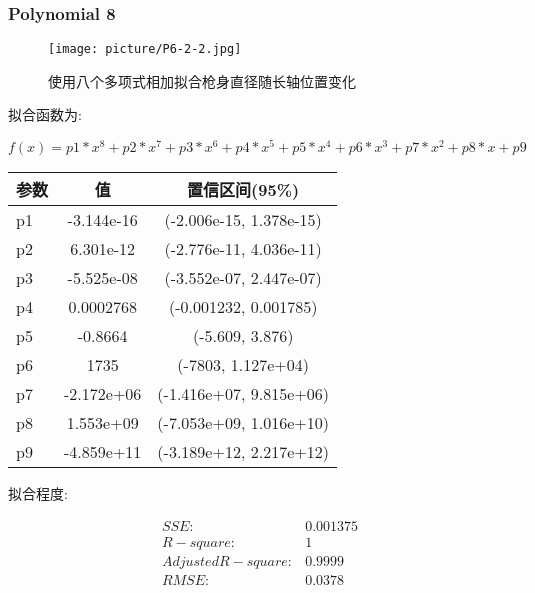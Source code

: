 \documentclass[UTF8]{ctexart}
\begin{document}
				\subsubsection{Polynomial 8}
				\begin{figure}[h]
					\texttt{[image: picture/P6-2-2.jpg]}
					\caption{使用八个多项式相加拟合枪身直径随长轴位置变化}
				\end{figure}
				\begin{flushleft}
					拟合函数为:
				\end{flushleft}
				\begin{center}
					\[    f(x) = p1*x^8 + p2*x^7 + p3*x^6 + p4*x^5 + 
					p5*x^4 + p6*x^3 + p7*x^2 + p8*x + p9
					\]				
					\begin{tabular}{|l|c|c|}
						\hline
						参数&值&置信区间(95\%)\\
						\hline
						 p1 &  -3.144e-16&  (-2.006e-15, 1.378e-15)\\
						 \hline
						p2 &   6.301e-12&  (-2.776e-11, 4.036e-11)\\
						\hline
						p3 &  -5.525e-08&  (-3.552e-07, 2.447e-07)\\
						\hline
						p4 &   0.0002768&  (-0.001232, 0.001785)\\
						\hline
						p5 &     -0.8664&  (-5.609, 3.876)\\
						\hline
						p6 &        1735&  (-7803, 1.127e+04)\\
						\hline
						p7 &  -2.172e+06&  (-1.416e+07, 9.815e+06)\\
						\hline
						p8 &   1.553e+09&  (-7.053e+09, 1.016e+10)\\
						\hline
						p9 &  -4.859e+11&  (-3.189e+12, 2.217e+12)\\
						\hline
										
					\end{tabular}
				\end{center}
				\begin{flushleft}
					拟合程度:
				\end{flushleft}
				\begin{center}
					$$
					\begin{matrix}
					SSE:&0.001375\\
					R-square:&1\\
					Adjusted R-square:&0.9999\\
					RMSE:&0.0378\\
					\end{matrix}
					$$
				\end{center}
\end{document}
